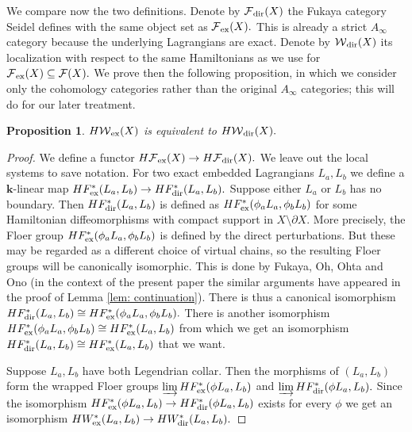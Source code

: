 \documentclass{article}
\theoremstyle{plain}%
\newtheorem{prop}[thm]{Proposition}
\theoremstyle{definition}
\numberwithin{equation}{section}
\numberwithin{figure}{section}
\def\cF{{\mathbin{\cal F}}}
\def\cW{{\mathbin{\cal W}}}
\def\ph{\phi}
\def\d{{\partial}}
\def\-{\setminus}
\def\iy{\infty}
\def\sb{\subseteq}
\def\k{{\mathbf{k}}}\def\b{{\mathbf{b}}}\def\x{{\mathbf{x}}}
\def\ex{{   {\rm ex}    }}\def\virt{{   {\rm virt}    }}\def\ev{{\rm ev}}\def\sing{{\rm sing}}\def\cont{{\rm cont}}
\begin{document}
We compare now the two definitions. Denote by $\cF_{\rm dir}(X)$ the Fukaya category Seidel defines with the same object set as $\cF_\ex(X).$ This is already a strict $A_\iy$ category because the underlying Lagrangians are exact. Denote by $\cW_{\rm dir}(X)$ its localization with respect to the same Hamiltonians as we use for $\cF_\ex(X)\sb \cF(X).$ We prove then the following proposition, in which we consider only the cohomology categories rather than the original $A_\iy$ categories; this will do for our later treatment.
\begin{prop}\label{prop: ex}
$H\cW_\ex(X)$ is equivalent to $H\cW_{\rm dir}(X).$
\end{prop}
\begin{proof}
We define a functor $H\cF_\ex(X)\to H\cF_{\rm dir}(X).$ We leave out the local systems to save notation.
For two exact embedded Lagrangians $L_a,L_b$ we define a $\k$-linear map
$HF^*_\ex(L_a,L_b)\to HF^*_{\rm dir}(L_a,L_b).$
Suppose either $L_a$ or $L_b$ has no boundary.
Then $HF^*_{\rm dir} (L_a,L_b)$ is defined as $HF_\ex^*(\ph_aL_a,\ph_bL_b)$ for some Hamiltonian diffeomorphisms with compact support in $X\-\d X.$
More precisely, the Floer group $HF_\ex^*(\ph_aL_a,\ph_bL_b)$ is defined by the direct perturbations. But these may be regarded as a different choice of virtual chains, so the resulting Floer groups will be canonically isomorphic. This is done by Fukaya, Oh, Ohta and Ono \cite[Theorem G]{FOOO} (in the context of the present paper the similar arguments have appeared in the proof of Lemma \ref{lem: continuation}).
There is thus a canonical isomorphism $HF^*_{\rm dir} (L_a,L_b)\cong HF_\ex^*(\ph_aL_a,\ph_bL_b).$
There is another isomorphism $HF_\ex^*(\ph_aL_a,\ph_bL_b)\cong HF_\ex^*(L_a,L_b)$ from which we get an isomorphism $HF^*_{\rm dir} (L_a,L_b)\cong HF_\ex^*(L_a,L_b)$ that we want.

Suppose $L_a,L_b$ have both Legendrian collar. Then the morphisms of $(L_a,L_b)$ form the wrapped Floer groups $\varinjlim HF_\ex^*(\ph L_a, L_b)$ and $\varinjlim HF_{\rm dir}^*(\ph L_a, L_b).$
Since the isomorphism
$HF_\ex^*(\ph L_a, L_b)\to HF^*_{\rm dir}(\ph L_a, L_b)$ exists for every $\ph$ we get an isomorphism $HW_\ex^*(L_a, L_b)\to HW^*_{\rm dir}(L_a, L_b).$


\end{proof}
\end{document}
